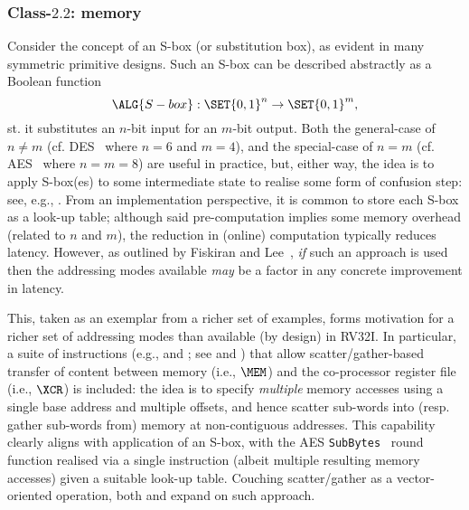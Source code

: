 
\subsubsection{Class-$2.2$: memory}
\label{sec:bg:feature:2:2}

Consider the concept of an S-box (or substitution box), as evident in many 
symmetric primitive designs.  Such an S-box can be described abstractly as 
a Boolean function
\[
\ALG{S-box} : \SET{ 0, 1 }^{n} \rightarrow \SET{ 0, 1 }^{m} ,
\]
st. it substitutes an $n$-bit input for an $m$-bit output.  Both 
the general-case of $n \neq m$
(cf. DES~\cite{SCARV:FIPS:46_3} where $n = 6$ and $m = 4$),
and 
the special-case of $n =    m$
(cf. AES~\cite{SCARV:FIPS:197}  where $n = m = 8$)
are useful in practice, but, either way, the idea is to apply S-box(es) to
some intermediate state to realise some form of confusion step: see, e.g., 
\cite[Section 1.3]{SCARV:KnuRob:11}.
From an implementation perspective, it is common to store each S-box as a
look-up table; although said pre-computation implies some memory overhead
(related to $n$ and $m$), the reduction in (online) computation typically
reduces latency.
However, as outlined by Fiskiran and Lee~\cite{SCARV:FisLee:01}, {\em if}
such an approach is used then the addressing modes available {\em may} be
a factor in any concrete improvement in latency.

This, taken as an exemplar from a richer set of examples, forms motivation
for a richer set of addressing modes than available (by design) in RV32I.
In particular, 
a suite of instructions 
(e.g.,  and ; see  and )
that allow 
scatter/gather-based
transfer of content between
   memory                         (i.e., $\MEM$)
and
the    co-processor register file (i.e., $\XCR$)
is included: the idea is to specify {\em multiple} memory accesses using a
single base address and multiple offsets, and hence scatter sub-words into 
(resp. gather sub-words from) memory at non-contiguous addresses.  
This capability clearly aligns with application of an S-box, with the AES 
{\tt SubBytes}~\cite[Section 5.1.1]{SCARV:FIPS:197} 
round function realised via a single  instruction 
(albeit multiple resulting memory accesses) given a suitable look-up table.
Couching scatter/gather as a vector-oriented operation, both
\cite[Section 3.1]{SCARV:FouMoo:05} 
and 
\cite[Section 3.3]{SCARV:Fournier:07}
expand on such approach.

